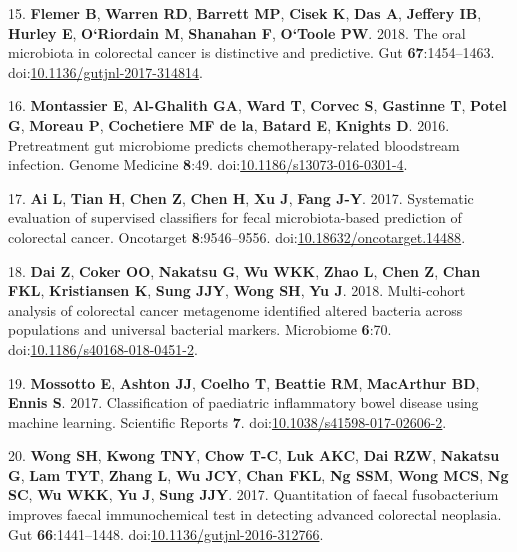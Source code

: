 \documentclass[
  11pt,
]{article}
\begin{document}
\leavevmode\hypertarget{ref-flemer_oral_2018}{}%
15. \textbf{Flemer B}, \textbf{Warren RD}, \textbf{Barrett MP},
\textbf{Cisek K}, \textbf{Das A}, \textbf{Jeffery IB}, \textbf{Hurley
E}, \textbf{O`Riordain M}, \textbf{Shanahan F}, \textbf{O`Toole PW}.
2018. The oral microbiota in colorectal cancer is distinctive and
predictive. Gut \textbf{67}:1454--1463.
doi:\href{https://doi.org/10.1136/gutjnl-2017-314814}{10.1136/gutjnl-2017-314814}.

\leavevmode\hypertarget{ref-montassier_pretreatment_2016}{}%
16. \textbf{Montassier E}, \textbf{Al-Ghalith GA}, \textbf{Ward T},
\textbf{Corvec S}, \textbf{Gastinne T}, \textbf{Potel G}, \textbf{Moreau
P}, \textbf{Cochetiere MF de la}, \textbf{Batard E}, \textbf{Knights D}.
2016. Pretreatment gut microbiome predicts chemotherapy-related
bloodstream infection. Genome Medicine \textbf{8}:49.
doi:\href{https://doi.org/10.1186/s13073-016-0301-4}{10.1186/s13073-016-0301-4}.

\leavevmode\hypertarget{ref-ai_systematic_2017}{}%
17. \textbf{Ai L}, \textbf{Tian H}, \textbf{Chen Z}, \textbf{Chen H},
\textbf{Xu J}, \textbf{Fang J-Y}. 2017. Systematic evaluation of
supervised classifiers for fecal microbiota-based prediction of
colorectal cancer. Oncotarget \textbf{8}:9546--9556.
doi:\href{https://doi.org/10.18632/oncotarget.14488}{10.18632/oncotarget.14488}.

\leavevmode\hypertarget{ref-dai_multi-cohort_2018}{}%
18. \textbf{Dai Z}, \textbf{Coker OO}, \textbf{Nakatsu G}, \textbf{Wu
WKK}, \textbf{Zhao L}, \textbf{Chen Z}, \textbf{Chan FKL},
\textbf{Kristiansen K}, \textbf{Sung JJY}, \textbf{Wong SH}, \textbf{Yu
J}. 2018. Multi-cohort analysis of colorectal cancer metagenome
identified altered bacteria across populations and universal bacterial
markers. Microbiome \textbf{6}:70.
doi:\href{https://doi.org/10.1186/s40168-018-0451-2}{10.1186/s40168-018-0451-2}.

\leavevmode\hypertarget{ref-mossotto_classification_2017}{}%
19. \textbf{Mossotto E}, \textbf{Ashton JJ}, \textbf{Coelho T},
\textbf{Beattie RM}, \textbf{MacArthur BD}, \textbf{Ennis S}. 2017.
Classification of paediatric inflammatory bowel disease using machine
learning. Scientific Reports \textbf{7}.
doi:\href{https://doi.org/10.1038/s41598-017-02606-2}{10.1038/s41598-017-02606-2}.

\leavevmode\hypertarget{ref-wong_quantitation_2017}{}%
20. \textbf{Wong SH}, \textbf{Kwong TNY}, \textbf{Chow T-C}, \textbf{Luk
AKC}, \textbf{Dai RZW}, \textbf{Nakatsu G}, \textbf{Lam TYT},
\textbf{Zhang L}, \textbf{Wu JCY}, \textbf{Chan FKL}, \textbf{Ng SSM},
\textbf{Wong MCS}, \textbf{Ng SC}, \textbf{Wu WKK}, \textbf{Yu J},
\textbf{Sung JJY}. 2017. Quantitation of faecal fusobacterium improves
faecal immunochemical test in detecting advanced colorectal neoplasia.
Gut \textbf{66}:1441--1448.
doi:\href{https://doi.org/10.1136/gutjnl-2016-312766}{10.1136/gutjnl-2016-312766}.
\end{document}
